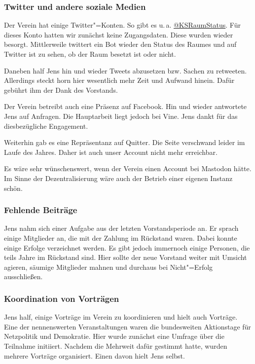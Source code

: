 \documentclass[ngerman]{scrartcl}
\begin{document}
\subsubsection{Twitter und andere soziale Medien}

Der Verein hat einige Twitter"=Konten. So gibt es
u.\,a. \href{https://twitter.com/ksraumstatus}{@KSRaumStatus}. Für dieses Konto
hatten wir zunächst keine Zugangsdaten. Diese wurden wieder
besorgt. Mittlerweile twittert ein Bot wieder den Status des Raumes und auf
Twitter ist zu sehen, ob der Raum besetzt ist oder nicht.

Daneben half Jens hin und wieder Tweets abzusetzen bzw. Sachen zu
retweeten. Allerdings steckt horn hier wesentlich mehr Zeit und Aufwand
hinein. Dafür gebührt ihm der Dank des Vorstands.

Der Verein betreibt auch eine Präsenz auf Facebook. Hin und wieder antwortete
Jens auf Anfragen. Die Hauptarbeit liegt jedoch bei Vine. Jens dankt für das
diesbezügliche Engagement.

Weiterhin gab es eine Repräsentanz auf Quitter. Die Seite verschwand leider im
Laufe des Jahres. Daher ist auch unser Account nicht mehr erreichbar.

Es wäre sehr wünschenswert, wenn der Verein einen Account bei Mastodon hätte. Im
Sinne der Dezentralisierung wäre auch der Betrieb einer eigenen Instanz schön.

\subsubsection{Fehlende Beiträge}


Jens nahm sich einer Aufgabe aus der letzten Vorstandsperiode an. Er sprach
einige Mitglieder an, die mit der Zahlung im Rückstand waren. Dabei konnte
einige Erfolge verzeichnet werden. Es gibt jedoch immernoch einige Personen, die
teils Jahre im Rückstand sind. Hier sollte der neue Vorstand weiter mit Umsicht
agieren, säumige Mitglieder mahnen und durchaus bei Nicht"=Erfolg ausschließen.

\subsubsection{Koordination von Vorträgen}

Jens half, einige Vorträge im Verein zu koordinieren und hielt auch
Vorträge. Eine der nennenswerten Veranstaltungen waren die bundesweiten
Aktionstage für Netzpolitik und Demokratie. Hier wurde zunächst eine Umfrage
über die Teilnahme initiiert. Nachdem die Mehrweit dafür gestimmt hatte, wurden
mehrere Vorträge organisiert. Einen davon hielt Jens selbst.
\end{document}

